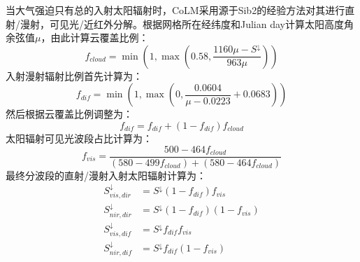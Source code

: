 当大气强迫只有总的入射太阳辐射时，CoLM采用源于Sib2的经验方法对其进行直射/漫射，可见光/近红外分解。根据网格所在经纬度和Julian
day计算太阳高度角余弦值\(\mu\)，由此计算云覆盖比例：
%
\begin{equation}
f_{cloud} = \min\left( 1,\max\left( 0.58,\frac{1160\mu - S^{\downarrow}}{963\mu} \right) \right)
\end{equation}
%
入射漫射辐射比例首先计算为：
%
\begin{equation}
f_{dif} = \min\left( 1,\max\left( 0,\frac{0.0604}{\mu - 0.0223} + 0.0683 \right) \right)
\end{equation}
%
然后根据云覆盖比例调整为：
%
\begin{equation}
f_{dif} = f_{dif} + \left( 1 - f_{dif} \right)f_{cloud}
\end{equation}
%
太阳辐射可见光波段占比计算为：
%
\begin{equation}
f_{vis} = \frac{500 - {464f}_{cloud}}{\left( 580 - {499f}_{cloud} \right) + \left( 580 - {464f}_{cloud} \right)}
\end{equation}
%
最终分波段的直射/漫射入射太阳辐射计算为：
%
\begin{equation}
\begin{aligned}
S_{vis,dir}^{\downarrow} &= S^{\downarrow}\left( 1 - f_{dif} \right)f_{vis}\\
%
S_{nir,dir}^{\downarrow} &= S^{\downarrow}\left( 1 - f_{dif} \right)\left( 1 - f_{vis} \right)\\
%
S_{vis,dif}^{\downarrow} &= S^{\downarrow}f_{dif}f_{vis}\\
%
S_{nir,dif}^{\downarrow} &= S^{\downarrow}f_{dif}\left( 1 - f_{vis} \right)
\end{aligned}
\end{equation}
%

